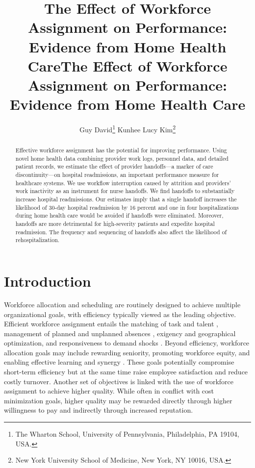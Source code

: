 \documentclass[final,12pt, notitlepage]{article}
\title{The Effect of Workforce Assignment on Performance: Evidence from Home Health Care}
\author{Guy David\thanks{The Wharton School, University of Pennsylvania, Philadelphia, PA 19104, USA.} \quad \quad Kunhee Lucy Kim\thanks{New York University School of Medicine, New York, NY 10016, USA.}}
\title{The Effect of Workforce Assignment on Performance: Evidence from Home Health Care}
\date{\parbox{\linewidth}{\centering%
	February 2018 \hspace*{0cm} \endgraf\medskip
}}
\begin{document}
\begin{singlespace}
\maketitle
\thispagestyle{empty}


\begin{abstract}
Effective workforce assignment has the potential for improving performance. Using novel home health data combining provider work logs, personnel data, and detailed patient records, we estimate the effect of provider handoffs---a marker of care discontinuity---on hospital readmissions, an important performance measure for healthcare systems. We use workflow interruption caused by attrition and providers' work inactivity as an instrument for nurse handoffs.
We find handoffs to substantially increase hospital readmissions. Our estimates imply that a single handoff increases the likelihood of 30-day hospital readmission by 16 percent and one in four hospitalizations during home health care would be avoided if handoffs were eliminated. Moreover, handoffs are more detrimental for high-severity patients and expedite hospital readmission. The frequency and sequencing of handoffs also affect the likelihood of rehospitalization.
\end{abstract}


\end{singlespace}


\newpage
\section{Introduction}


Workforce allocation and scheduling are routinely designed to achieve multiple organizational goals, with efficiency typically viewed as the leading objective. Efficient workforce assignment entails the matching of task and talent \citep{Garicano2004}, management of planned and unplanned absences \citep{Ehrenberg1970, Allen1983}, exigency and geographical optimization, and responsiveness to demand shocks \citep{Hamermesh1996}.
Beyond efficiency, workforce allocation goals may include rewarding seniority, promoting workforce equity, and enabling effective learning and synergy \citep{Mas2009}. These goals potentially compromise short-term efficiency but at the same time raise employee satisfaction and reduce costly turnover. Another set of objectives is linked with the use of workforce assignment to achieve higher quality. While often in conflict with cost minimization goals, higher quality may be rewarded directly through higher willingness to pay and indirectly through increased reputation.
\end{document}
